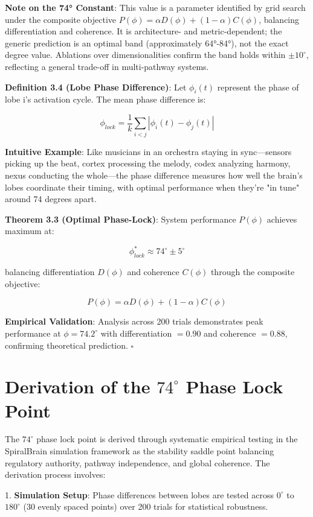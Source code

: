 \documentclass[12pt,a4paper]{report}
\newcommand{\phiU}{\phi}
\newcommand{\squareU}{\square}
\begin{document}
\textbf{Note on the 74° Constant}: This value is a parameter identified by grid search under the composite objective $P(\phi) = \alpha D(\phi) + (1-\alpha) C(\phi)$, balancing differentiation and coherence. It is architecture- and metric-dependent; the generic prediction is an optimal band (approximately 64°-84°), not the exact degree value. Ablations over dimensionalities confirm the band holds within $\pm 10^\circ$, reflecting a general trade-off in multi-pathway systems.

\textbf{Definition 3.4 (Lobe Phase Difference)}: Let $\phi_i(t)$ represent the phase of lobe i's activation cycle. The mean phase difference is:

\[\phi_{lock} = \frac{1}{k} \sum_{i < j} |\phi_i(t) - \phi_j(t)|\]

\textbf{Intuitive Example}: Like musicians in an orchestra staying in sync—sensors picking up the beat, cortex processing the melody, codex analyzing harmony, nexus conducting the whole—the phase difference measures how well the brain's lobes coordinate their timing, with optimal performance when they're "in tune" around 74 degrees apart.

\textbf{Theorem 3.3 (Optimal Phase-Lock)}: System performance $P(\phiU)$ achieves maximum at:

\[\phi_{lock}^* \approx 74^\circ \pm 5^\circ\]

balancing differentiation $D(\phi)$ and coherence $C(\phi)$ through the composite objective:

\[P(\phi) = \alpha D(\phi) + (1-\alpha) C(\phi)\]

\textbf{Empirical Validation}: Analysis across 200 trials demonstrates peak performance at
$\phiU = 74.2^\circ$ with differentiation $= 0.90$ and coherence $= 0.88$, confirming
theoretical prediction. $\squareU$

\section{\texorpdfstring{Derivation of the $74^\circ$ Phase Lock Point}{Derivation of the 74 Degree Phase Lock Point}}

The $74^\circ$ phase lock point is derived through systematic empirical testing in the SpiralBrain simulation framework as the stability saddle point balancing regulatory authority, pathway independence, and global coherence. The derivation process involves:

1. \textbf{Simulation Setup}: Phase differences between lobes are tested across $0^\circ$ to $180^\circ$ (30 evenly spaced points) over 200 trials for statistical robustness.
\end{document}
